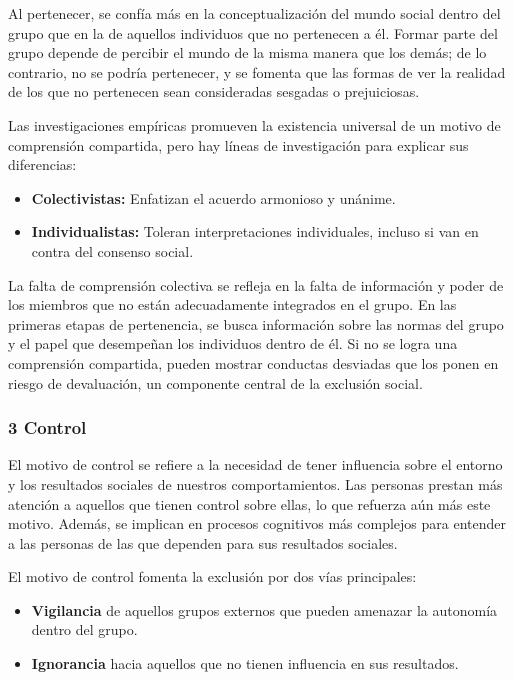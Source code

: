 \documentclass[
]{website}
\providecommand{\tightlist}{%
  \setlength{\itemsep}{0pt}\setlength{\parskip}{0pt}}
\begin{document}
Al pertenecer, se confía más en la conceptualización del mundo social dentro del grupo que en la de aquellos individuos que no pertenecen a él. Formar parte del grupo depende de percibir el mundo de la misma manera que los demás; de lo contrario, no se podría pertenecer, y se fomenta que las formas de ver la realidad de los que no pertenecen sean consideradas sesgadas o prejuiciosas.

Las investigaciones empíricas promueven la existencia universal de un motivo de comprensión compartida, pero hay líneas de investigación para explicar sus diferencias:

\begin{itemize}
\tightlist
\item
  \textbf{Colectivistas:} Enfatizan el acuerdo armonioso y unánime.
\item
  \textbf{Individualistas:} Toleran interpretaciones individuales, incluso si van en contra del consenso social.
\end{itemize}

La falta de comprensión colectiva se refleja en la falta de información y poder de los miembros que no están adecuadamente integrados en el grupo. En las primeras etapas de pertenencia, se busca información sobre las normas del grupo y el papel que desempeñan los individuos dentro de él. Si no se logra una comprensión compartida, pueden mostrar conductas desviadas que los ponen en riesgo de devaluación, un componente central de la exclusión social.

\subsubsection*{3 Control}\label{subtema2_2_3}

El motivo de control se refiere a la necesidad de tener influencia sobre el entorno y los resultados sociales de nuestros comportamientos. Las personas prestan más atención a aquellos que tienen control sobre ellas, lo que refuerza aún más este motivo. Además, se implican en procesos cognitivos más complejos para entender a las personas de las que dependen para sus resultados sociales.

El motivo de control fomenta la exclusión por dos vías principales:

\begin{itemize}
\tightlist
\item
  \textbf{Vigilancia} de aquellos grupos externos que pueden amenazar la autonomía dentro del grupo.
\item
  \textbf{Ignorancia} hacia aquellos que no tienen influencia en sus resultados.
\end{itemize}
\end{document}

